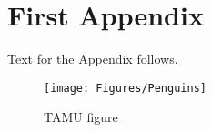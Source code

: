 %
%
%
%



\chapter{First Appendix}\label{appendix:01}

Text for the Appendix follows.

\begin{figure}[!htb]
\centering
\texttt{[image: Figures/Penguins]}
\caption{TAMU figure}
\label{fig:tamu-fig5}
\end{figure}
